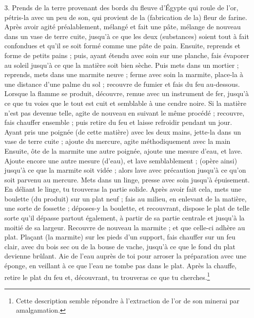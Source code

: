 \documentclass[landscape, a4paper, 11pt, oneside, polutonikogreek, french]{article}
\begin{document}
3. Prends de la terre provenant des bords du fleuve d'Égypte qui roule de l'or, pétris-la avec un peu de son, qui provient de la (fabrication de la) fleur de farine. Après avoir agité préalablement, mélangé et fait une pâte, mélange de nouveau dans un vase de terre cuite, jusqu'à ce que les deux (substances) soient tout à fait confondues et qu'il se soit formé comme une pâte de pain. Ensuite, reprends et forme de petits pains ; puis, ayant étendu avec soin sur une planche, fais évaporer au soleil jusqu'à ce que la matière soit bien sèche. Puis mets dans un mortier ; reprends, mets dans une marmite neuve ; ferme avec soin la marmite, place-la à une distance d'une palme du sol ; recouvre de fumier et fais du feu au-dessous. Lorsque la flamme se produit, découvre, remue avec un instrument de fer, jusqu'à ce que tu voies que le tout est cuit et semblable à une cendre noire. Si la matière n'est pas devenue telle, agite de nouveau en suivant le même procédé ; recouvre, fais chauffer ensemble ; puis retire du feu et laisse refroidir pendant un jour. Ayant pris une poignée (de cette matière) avec les deux mains, jette-la dans un vase de terre cuite ; ajoute du mercure, agite méthodiquement avec la main Ensuite, ôte de la marmite une autre poignée, ajoute une mesure d'eau, et lave. Ajoute encore une autre mesure (d'eau), et lave semblablement ; (opère ainsi) jusqu'à ce que la marmite soit vidée ; alors lave avec précaution jusqu'à ce qu'on soit parvenu au mercure. Mets dans un linge, presse avec soin jusqu'à épuisement. En déliant le linge, tu trouveras la partie solide. Après avoir fait cela, mets une boulette (du produit) sur un plat neuf ; fais au milieu, en enlevant de la matière, une sorte de fossette ; déposes-y la boulette, et recouvrant, dispose le plat de telle sorte qu'il dépasse partout également, à partir de sa partie centrale et jusqu'à la moitié de sa largeur. Recouvre de nouveau la marmite ; et que celle-ci adhère au plat. Plaçant (la marmite) sur les pieds d'un support, fais chauffer sur un feu clair, avec du bois sec ou de la bouse de vache, jusqu'à ce que le fond du plat devienne brûlant. Aie de l'eau auprès de toi pour arroser la préparation avec une éponge, en veillant à ce que l'eau ne tombe pas dans le plat. Après la chauffe, retire le plat du feu et, découvrant, tu trouveras ce que tu cherches.\footnote{Cette description semble répondre à l'extraction de l'or de son minerai par amalgamation.}

\bigskip
\centerline{\EightStarTaper}
\centerline{\EightStarTaper\EightStarTaper}
\bigskip
\end{document}
